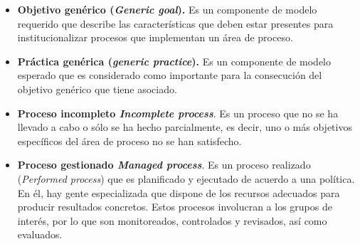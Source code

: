 \begin{itemize}
\item \textbf{\hypertarget{ggoal}{Objetivo genérico} (\textit{Generic goal}).} Es un componente de modelo requerido que describe las características que deben estar presentes para institucionalizar procesos que implementan un área de proceso. 
\item \textbf{\hypertarget{gpractice}{Práctica genérica} (\textit{generic practice}).} Es un componente de modelo esperado que es considerado como importante para la consecución del objetivo genérico que tiene asociado.
\item \textbf{Proceso incompleto \textit{Incomplete process}}. Es un proceso que no se ha llevado a cabo o sólo se ha hecho parcialmente, es decir, uno o más objetivos específicos del área de proceso no se han satisfecho.

\item \textbf{Proceso gestionado \textit{Managed process}}. Es un proceso realizado (\textit{Performed process}) que es planificado y ejecutado de acuerdo a una política. En él, hay gente especializada que dispone de los recursos adecuados para producir resultados concretos. Estos procesos involucran a los grupos de interés, por lo que son monitoreados, controlados y revisados, así como evaluados.



\end{itemize}

